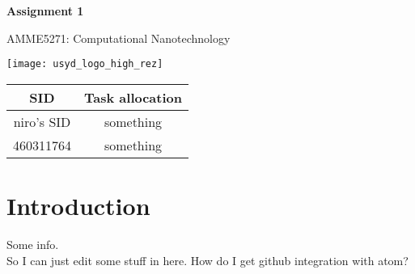 \documentclass[11pt]{article}
\begin{document}


\begin{titlepage}
	\begin{center}
		\vspace*{1cm}

		\Huge
		\textbf{Assignment 1}

		\vspace{0.5cm}
		\LARGE
		AMME5271: Computational Nanotechnology

		\vfill

		\texttt{[image: usyd\_logo\_high\_rez]}

		\vfill

		\begin{table}[H]
			\centering
			\Large
			\begin{tabular}{@{}cc@{}}
				\toprule
				SID & Task allocation \\
				\midrule
				niro's SID & something \\
				460311764 & something\\
				\bottomrule
			\end{tabular}
		\end{table}
	\end{center}
\end{titlepage}
\newpage

\clearpage
\thispagestyle{empty}
\tableofcontents
\listoftables
\listoffigures

\clearpage
{}

\section{Introduction}
Some info. \\
So I can just edit some stuff in here. How do I get github integration with atom?
\end{document}
